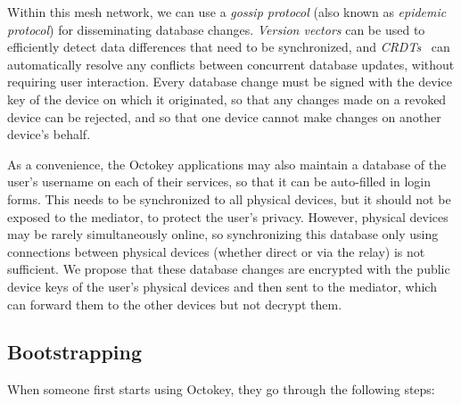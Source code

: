 Within this mesh network, we can use a \emph{gossip protocol} (also known as \emph{epidemic
protocol}) \cite{Demers89} for disseminating database changes. \emph{Version vectors}
\cite{ParkerJr83} can be used to efficiently detect data differences that need to be synchronized,
and \emph{CRDTs}~\cite{Shapiro11} can automatically resolve any conflicts between concurrent
database updates, without requiring user interaction. Every database change must be signed with the
device key of the device on which it originated, so that any changes made on a revoked device can be
rejected, and so that one device cannot make changes on another device's behalf.

As a convenience, the Octokey applications may also maintain a database of the user's username on
each of their services, so that it can be auto-filled in login forms. This needs to be synchronized
to all physical devices, but it should not be exposed to the mediator, to protect the user's
privacy. However, physical devices may be rarely simultaneously online, so synchronizing this
database only using connections between physical devices (whether direct or via the relay) is not
sufficient. We propose that these database changes are encrypted with the public device keys of the
user's physical devices and then sent to the mediator, which can forward them to the other devices
but not decrypt them.

\subsection{Bootstrapping}\label{sec:bootstrap}

When someone first starts using Octokey, they go through the following steps:

